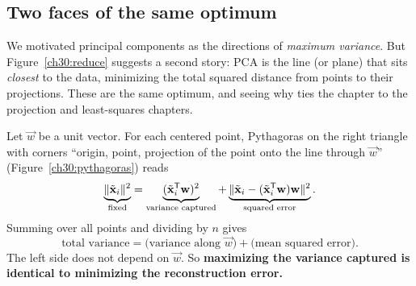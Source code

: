 \subsection{Two faces of the same optimum}

We motivated principal components as the directions of \emph{maximum variance}. But
Figure~\ref{ch30:reduce} suggests a second story: PCA is the line (or plane) that
sits \emph{closest} to the data, minimizing the total squared distance from points
to their projections. These are the same optimum, and seeing why ties the chapter
to the projection and least-squares chapters.

\begin{formalbox}
Let $\vec w$ be a unit vector. For each centered point, Pythagoras on the right
triangle with corners ``origin, point, projection of the point onto the line through
$\vec w$'' (Figure~\ref{ch30:pythagoras}) reads
\[
  \underbrace{\lVert\tilde{\mathbf{x}}_i\rVert^2}_{\text{fixed}}
  =\underbrace{(\tilde{\mathbf{x}}_i^{\mathsf{T}}\mathbf{w})^2}_{\text{variance captured}}
  +\underbrace{\lVert\tilde{\mathbf{x}}_i-(\tilde{\mathbf{x}}_i^{\mathsf{T}}\mathbf{w})\mathbf{w}\rVert^2}_{\text{squared error}} .
\]
Summing over all points and dividing by $n$ gives
\[
  \text{total variance}=\bigl(\text{variance along }\vec w\bigr)+\bigl(\text{mean squared error}\bigr).
\]
The left side does not depend on
$\vec w$. So \textbf{maximizing the variance captured is identical to minimizing the
reconstruction error.}
\end{formalbox}

